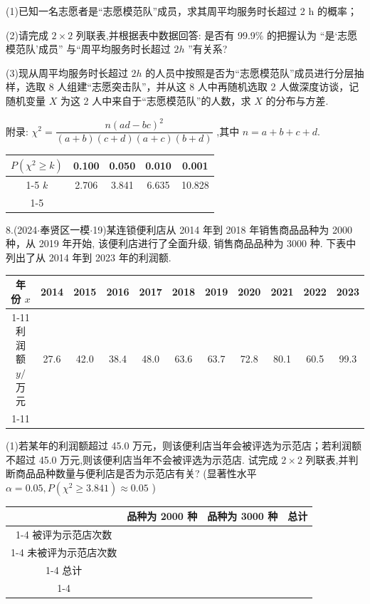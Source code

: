 (1)已知一名志愿者是“志愿模范队”成员，求其周平均服务时长超过 2 h 的概率；

(2)请完成 $2 \times  2$ 列联表,并根据表中数据回答: 是否有 99.9\% 的把握认为 “是‘志愿模范队’成员” 与“周平均服务时长超过 $2{h}$ ”有关系?

(3)现从周平均服务时长超过 $2{h}$ 的人员中按照是否为“志愿模范队”成员进行分层抽样，选取 8 人组建“志愿突击队”，并从这 8 人中再随机选取 2 人做深度访谈，记随机变量 $X$ 为这 2 人中来自于“志愿模范队”的人数，求 $X$ 的分布与方差.

附录: ${\chi }^{2} = \dfrac{n{\left( ad - bc\right) }^{2}}{\left( {a + b}\right) \left( {c + d}\right) \left( {a + c}\right) \left( {b + d}\right) }$ ,其中 $n = a + b + c + d$.

\begin{center}

\begin{tabular}{|c|c|c|c|c|}
\hline
$P\left( {{\chi }^{2} \geq  k}\right)$ & 0.100 & 0.050 & 0.010 & 0.001 \\
\cline{1-5}
$k$ & 2.706 & 3.841 & 6.635 & 10.828 \\
\cline{1-5}
\hline
\end{tabular}
\end{center}

8.(2024$\cdot$奉贤区一模$\cdot$19)某连锁便利店从 2014 年到 2018 年销售商品品种为 2000 种，从 2019 年开始, 该便利店进行了全面升级, 销售商品品种为 3000 种. 下表中列出了从 2014 年到 2023 年的利润额.

\begin{center}

\begin{tabular}{|c|c|c|c|c|c|c|c|c|c|c|}
\hline
年份 $x$ & 2014 & 2015 & 2016 & 2017 & 2018 & 2019 & 2020 & 2021 & 2022 & 2023 \\
\cline{1-11}
利润额 $y/$ 万元 & 27.6 & 42.0 & 38.4 & 48.0 & 63.6 & 63.7 & 72.8 & 80.1 & 60.5 & 99.3 \\
\cline{1-11}
\hline
\end{tabular}
\end{center}

(1)若某年的利润额超过 45.0 万元，则该便利店当年会被评选为示范店；若利润额不超过 45.0 万元,则该便利店当年不会被评选为示范店. 试完成 $2 \times  2$ 列联表,并判断商品品种数量与便利店是否为示范店有关? (显著性水平 $\alpha  = {0.05},P\left( {{\chi }^{2} \geq  {3.841}}\right)  \approx  {0.05}$ )

\begin{center}

\begin{tabular}{|c|c|c|c|}
\hline
\phantom{X} & 品种为 2000 种 & 品种为 3000 种 & 总计 \\
\cline{1-4}
被评为示范店次数 & \phantom{X} & \phantom{X} & \phantom{X} \\
\cline{1-4}
未被评为示范店次数 & \phantom{X} & \phantom{X} & \phantom{X} \\
\cline{1-4}
总计 & \phantom{X} & \phantom{X} & \phantom{X} \\
\cline{1-4}
\hline
\end{tabular}
\end{center}

